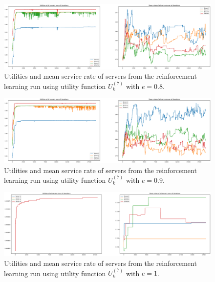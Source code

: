 \begin{figure}[H]
    \includegraphics[width=\textwidth]{chapters/00_appendix/03_more_rl_results/Bin/utility_7_eps/u7_1_e08.eps}
    \caption{Utilities and mean service rate of servers from the reinforcement
    learning run using utility function \(U_k^{(7)}\) with \(e = 0.8\).}
    \label{fig:RL_utility7_1_e08}
\end{figure}


\begin{figure}[H]
    \includegraphics[width=\textwidth]{chapters/00_appendix/03_more_rl_results/Bin/utility_7_eps/u7_1_e09.eps}
    \caption{Utilities and mean service rate of servers from the reinforcement
    learning run using utility function \(U_k^{(7)}\) with \(e = 0.9\).}
    \label{fig:RL_utility7_1_e09}
\end{figure}


\begin{figure}[H]
    \includegraphics[width=\textwidth]{chapters/00_appendix/03_more_rl_results/Bin/utility_7_eps/u7_1_e1.eps}
    \caption{Utilities and mean service rate of servers from the reinforcement
    learning run using utility function \(U_k^{(7)}\) with \(e = 1\).}
    \label{fig:RL_utility7_1_e1}
\end{figure}


